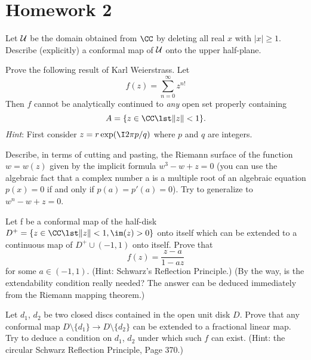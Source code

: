 
\section*{Homework 2}\renewcommand{\leftmark}{Homework 2}
\begin{exercise}
Let ${\cal U}$ be the domain obtained from $\CC$ by deleting all
real $x$ with $|x|\geq1$. Describe (explicitly) a conformal map
of ${\cal U}$ onto the upper half-plane. 
\end{exercise}
\begin{exercise}
Prove the following result of Karl Weierstrass. Let 
\begin{equation*}
f(z)=\sum^{\infty}_{n=0}z^{n!}
\end{equation*}
Then $f$ cannot be analytically continued to \emph{any} open set
properly containing
\begin{equation*}
A=\{z\in\CC\lst\|z\|<1\}.
\end{equation*}
\emph{Hint}: First consider $z=r\exp(\I 2\pi p/q)$ where $p$ and
$q$ are integers.
\end{exercise}
\begin{exercise}
Describe, in terms of cutting and pasting, the Riemann surface of the function
$w = w(z)$ given by the implicit formula $w^{3} - w + z = 0$ (you
can use the algebraic fact that a complex number a is a multiple
root of an algebraic equation $p(x) = 0$ if and only if $p(a) =
p'(a) = 0$). Try to generalize to $w^{n} - w + z = 0$. 
\end{exercise}
\begin{exercise}
Let f be a conformal map of the half-disk $D^{+} = \{z\in\CC \lst
\|z\| < 1, \im(z) > 0\}$ 
onto itself which can be extended to a continuous map of $D^{+}\cup (−1, 1)$ onto itself. Prove that
\begin{equation*}
f (z) = \frac{z-a}{1-az}
\end{equation*}
for some $a\in (-1, 1)$. (Hint: Schwarz's Reflection Principle.)
(By the way, is the extendability condition really needed? The
answer can be deduced immediately from the Riemann mapping
theorem.) 
\end{exercise}
\begin{exercise}
Let $d_{1}$, $d_{2}$ be two closed discs contained in the open
unit disk $D$. Prove that any conformal map
$D\setminus\{d_{1}\}\to D\setminus\{d_{2}\}$ can be extended to a
fractional linear map. Try to deduce a condition on $d_{1}$,
$d_{2}$ under which such $f$ can exist. (Hint: the circular
Schwarz Reflection Principle, Page 370.) 
\end{exercise}
